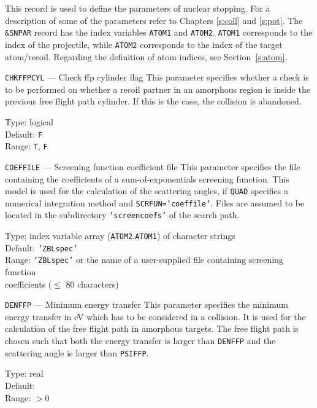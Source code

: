 This record is used to define the parameters of nuclear stopping. For
a description of some of the parameters refer to Chapters \ref{s:coll}
and \ref{s:pot}.  The \texttt{\&SNPAR} record has the index variables
\texttt{ATOM1} and \texttt{ATOM2}. \texttt{ATOM1} corresponds to the index 
of the projectile, while \texttt{ATOM2} corresponds to the index of the target
atom/recoil. Regarding the definition of atom indices, see Section~\ref{s:atom}.


\begin{keydescription}{\texttt{CHKFFPCYL} --- Check ffp cylinder flag}
%
  This parameter specifies whether a check is to be performed on whether
  a recoil partner in an amorphous region is inside the previous free flight 
  path cylinder. If this is the case, the collision is abandoned. 
  \begin{keytab}
    Type:    \> logical \\
    Default: \> \texttt{F} \\
    Range:   \> \texttt{T}, \texttt{F}
  \end{keytab}
\end{keydescription}

\begin{keydescription}{\texttt{COEFFILE} --- Screening function coefficient file}
%
  This parameter specifies the file containing the coefficients of a
  sum-of-exponentials screening function. This model is used for the calculation 
  of the scattering angles, if \texttt{QUAD} specifies a numerical integration
  method and \texttt{SCRFUN='coeffile'}. Files are assumed to be located in the 
  subdirectory \texttt{'screencoefs'} of the search path. 
  \begin{keytab}
    Type:    \> index variable array (\texttt{ATOM2},\texttt{ATOM1}) 
                of character strings \\ 
    Default: \> \texttt{'ZBLspec'} \\
    Range:   \> \texttt{'ZBLspec'} or the name of a user-supplied file 
                containing screening function \\
             \> coefficients ($\le$ 80 characters)
  \end{keytab}
\end{keydescription}

\begin{keydescription}{\texttt{DENFFP} --- Minimum energy transfer}
%
  This parameter specifies the minimum energy transfer in eV which has
  to be considered in a collision. It is used for the calculation of
  the free flight path in amorphous targets. The free flight path is
  chosen such that both the energy transfer is larger than
  \texttt{DENFFP} and the scattering angle is larger than
  \texttt{PSIFFP}.
  \begin{keytab}
    Type:    \> real \\
    Default:  \\
    Range:   \> $>0$
  \end{keytab}
\end{keydescription}

